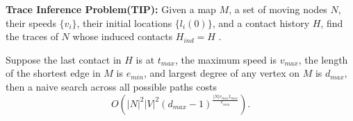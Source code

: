 \textbf{Trace Inference Problem(TIP):} Given a map $M$, a set of moving nodes $N$,
their speeds $\{v_i\}$, their initial locations $\{l_i(0)\}$, and a contact history $H$,
find the traces of $N$ whose induced contacts $H_{ind} = H$ .

Suppose the last contact in $H$ is at $t_{max}$, the maximum speed is $v_{max}$,
the length of the shortest edge in $M$ is
$e_{min}$, and largest degree of any vertex on $M$ is $d_{max}$, then
a naive search across all possible paths costs
\[O\left(|N|^2|V|^2 (d_{max}-1)^ {\frac{|N| v_{max} t_{max}}{e_{min}}}\right).\]

